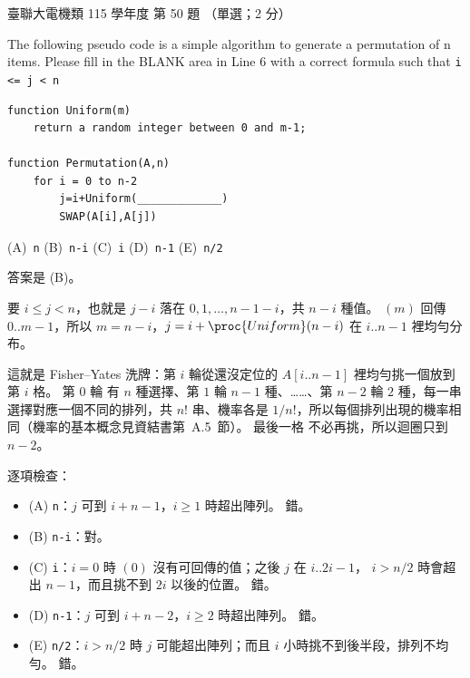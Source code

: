 \begin{pastexam}[label={px:ust-115-ee-ds-50}]{臺聯大電機類 115 學年度 第 50 題}
（單選；2 分）

The following pseudo code is a simple algorithm to generate a permutation of n items. Please fill in
the BLANK area in Line 6 with a correct formula such that \texttt{i <= j < n}
\begin{verbatim}
function Uniform(m)
    return a random integer between 0 and m-1;

function Permutation(A,n)
    for i = 0 to n-2
        j=i+Uniform(_____________)
        SWAP(A[i],A[j])
\end{verbatim}

(A)~\texttt{n} \qquad (B)~\texttt{n-i} \qquad (C)~\texttt{i} \qquad (D)~\texttt{n-1} \qquad (E)~\texttt{n/2}
\end{pastexam}

\begin{pastsoln}
答案是 (B)。

要 $i \le j < n$，也就是 $j - i$ 落在 $0, 1, \ldots, n - 1 - i$，共 $n - i$ 種值。
$(m)$ 回傳 $0..m-1$，所以 $m = n - i$，$j = i + \proc{Uniform}(n - i)$ 在
$i..n-1$ 裡均勻分布。

這就是 Fisher--Yates 洗牌：第 $i$ 輪從還沒定位的 $A[i..n-1]$ 裡均勻挑一個放到第 $i$ 格。 第 $0$ 輪
有 $n$ 種選擇、第 $1$ 輪 $n - 1$ 種、……、第 $n - 2$ 輪 $2$ 種，每一串選擇對應一個不同的排列，共
$n!$ 串、機率各是 $1/n!$，所以每個排列出現的機率相同（機率的基本概念見資結書第~A.5~節）。 最後一格
不必再挑，所以迴圈只到 $n - 2$。

逐項檢查：
\begin{itemize}
\item (A) \texttt{n}：$j$ 可到 $i + n - 1$，$i \ge 1$ 時超出陣列。 錯。
\item (B) \texttt{n-i}：對。
\item (C) \texttt{i}：$i = 0$ 時 $(0)$ 沒有可回傳的值；之後 $j$ 在 $i..2i-1$，
$i > n/2$ 時會超出 $n - 1$，而且挑不到 $2i$ 以後的位置。 錯。
\item (D) \texttt{n-1}：$j$ 可到 $i + n - 2$，$i \ge 2$ 時超出陣列。 錯。
\item (E) \texttt{n/2}：$i > n/2$ 時 $j$ 可能超出陣列；而且 $i$ 小時挑不到後半段，排列不均勻。 錯。
\end{itemize}
\end{pastsoln}
